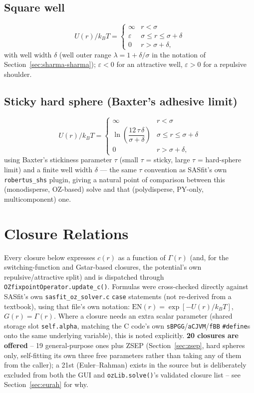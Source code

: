 \documentclass[11pt,a4paper]{article}
\newcommand{\code}[1]{\texttt{#1}}
\begin{document}
\subsection{Square well}
\label{sec:squarewell-potential}
\begin{equation}
  U(r)/k_BT = \begin{cases} \infty & r<\sigma\\ \varepsilon & \sigma\le r\le\sigma+\delta \\ 0 & r>\sigma+\delta,\end{cases}
\end{equation}
with well width $\delta$ (well outer range $\lambda=1+\delta/\sigma$ in the
notation of Section~\ref{sec:sharma-sharma}); $\varepsilon<0$ for an attractive
well, $\varepsilon>0$ for a repulsive shoulder.

\subsection{Sticky hard sphere (Baxter's adhesive limit)}
\label{sec:stickyhs-potential}
\begin{equation}
  U(r)/k_BT = \begin{cases} \infty & r<\sigma\\ \ln\!\left(\dfrac{12\,\tau\,\delta}{\sigma+\delta}\right) & \sigma\le r\le\sigma+\delta\\ 0 & r>\sigma+\delta,\end{cases}
\end{equation}
using Baxter's stickiness parameter $\tau$ (small $\tau$ = sticky, large $\tau$
= hard-sphere limit) and a finite well width $\delta$ --- the same $\tau$
convention as SASfit's own \code{robertus\_shs} plugin, giving a natural point
of comparison between this (monodisperse, OZ-based) solve and that
(polydisperse, PY-only, multicomponent) one.

\clearpage
\section{Closure Relations}
\label{sec:closures}

Every closure below expresses $c(r)$ as a function of $\Gamma(r)$ (and, for the
switching-function and Gstar-based closures, the potential's own
repulsive/attractive split) and is dispatched through
\code{OZfixpointOperator.update\_c()}. Formulas were cross-checked directly
against SASfit's own \code{sasfit\_oz\_solver.c} \code{case} statements (not
re-derived from a textbook), using that file's own notation:
$\mathrm{EN}(r)=\exp[-U(r)/k_BT]$, $G(r)=\Gamma(r)$. Where a closure needs an
extra scalar parameter (shared storage slot \code{self.alpha}, matching the
C code's own \code{sBPGG}/\code{aCJVM}/\code{fBB} \code{\#define}s onto the
same underlying variable), this is noted explicitly. \textbf{20 closures are
offered} -- 19 general-purpose ones plus ZSEP (Section~\ref{sec:zsep}, hard
spheres only, self-fitting its own three free parameters rather than taking
any of them from the caller); a 21st (Euler--Rahman) exists in the source
but is deliberately excluded from both the GUI and \code{ozLib.solve()}'s
validated closure list -- see Section~\ref{sec:eurah} for why.
\end{document}
